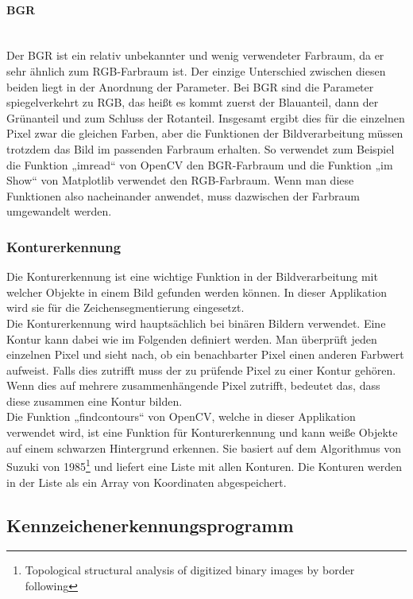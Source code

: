 \paragraph{BGR}\mbox{}\\
Der BGR ist ein relativ unbekannter und wenig verwendeter Farbraum, da er sehr ähnlich zum RGB-Farbraum ist. Der einzige 
Unterschied zwischen diesen beiden liegt in der Anordnung der Parameter. Bei BGR sind die Parameter spiegelverkehrt zu RGB, 
das heißt es kommt zuerst der Blauanteil, dann der Grünanteil und zum Schluss der Rotanteil. Insgesamt ergibt dies für die 
einzelnen Pixel zwar die gleichen Farben, aber die Funktionen der Bildverarbeitung müssen trotzdem das Bild im passenden 
Farbraum erhalten. So verwendet zum Beispiel die Funktion „imread“ von OpenCV den BGR-Farbraum und die Funktion „im Show“ 
von Matplotlib verwendet den RGB-Farbraum. Wenn man diese Funktionen also nacheinander anwendet, muss dazwischen der Farbraum 
umgewandelt werden.

\subsubsection{Konturerkennung}
Die Konturerkennung ist eine wichtige Funktion in der Bildverarbeitung mit welcher Objekte in einem Bild gefunden werden können. 
In dieser Applikation wird sie für die Zeichensegmentierung eingesetzt.\\

Die Konturerkennung wird hauptsächlich bei binären Bildern verwendet. Eine Kontur kann dabei wie im Folgenden definiert werden. 
Man überprüft jeden einzelnen Pixel und sieht nach, ob ein benachbarter Pixel einen anderen Farbwert aufweist. Falls dies 
zutrifft muss der zu prüfende Pixel zu einer Kontur gehören. Wenn dies auf mehrere zusammenhängende Pixel zutrifft, bedeutet 
das, dass diese zusammen eine Kontur bilden.\\

Die Funktion „findcontours“ von OpenCV, welche in dieser Applikation verwendet wird, ist eine Funktion für Konturerkennung 
und kann weiße Objekte auf einem schwarzen Hintergrund erkennen. Sie basiert auf dem Algorithmus von Suzuki von 
1985\footnote{Topological structural analysis of digitized binary images by border following} und 
liefert eine Liste mit allen Konturen. Die Konturen werden in der Liste als ein Array von Koordinaten abgespeichert.

\subsection{Kennzeichenerkennungsprogramm}

